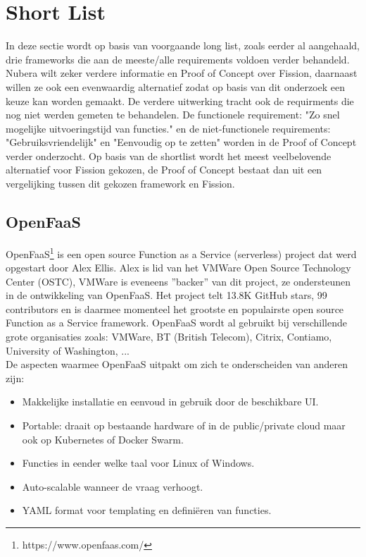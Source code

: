 \section{Short List}
\label{sec:short-list}

In deze sectie wordt op basis van voorgaande long list, zoals eerder al aangehaald, drie frameworks die aan de meeste/alle requirements voldoen verder behandeld. Nubera wilt zeker verdere informatie en Proof of Concept over Fission, daarnaast willen ze ook een evenwaardig alternatief zodat op basis van dit onderzoek een keuze kan worden gemaakt. De verdere uitwerking tracht ook de requirments die nog niet werden gemeten te behandelen. De functionele requirement: "Zo snel mogelijke uitvoeringstijd van functies." en de niet-functionele requirements: "Gebruiksvriendelijk" en "Eenvoudig op te zetten" worden in de Proof of Concept verder onderzocht. Op basis van de shortlist wordt het meest veelbelovende alternatief voor Fission gekozen, de Proof of Concept bestaat dan uit een vergelijking tussen dit gekozen framework en Fission.

\subsection{OpenFaaS}
OpenFaaS\footnote{https://www.openfaas.com/} is een open source Function as a Service (serverless) project dat werd opgestart door Alex Ellis. Alex is lid van het VMWare Open Source Technology Center (OSTC), VMWare is eveneens ''backer'' van dit project, ze ondersteunen in de ontwikkeling van OpenFaaS. Het project telt 13.8K GitHub stars, 99 contributors en is daarmee momenteel het grootste en populairste open source Function as a Service framework. OpenFaaS wordt al gebruikt bij verschillende grote organisaties zoals: VMWare, BT (British Telecom), Citrix, Contiamo, University of Washington, ... 
\\
De aspecten waarmee OpenFaaS uitpakt om zich te onderscheiden van anderen zijn: \autocite{OpenFaaS2019}
\begin{itemize}
    \item Makkelijke installatie en eenvoud in gebruik door de beschikbare UI.
    \item Portable: draait op bestaande hardware of in de public/private cloud maar ook op Kubernetes of Docker Swarm.
    \item Functies in eender welke taal voor Linux of Windows.
    \item Auto-scalable wanneer de vraag verhoogt.
    \item YAML format voor templating en definiëren van functies.
\end{itemize}
